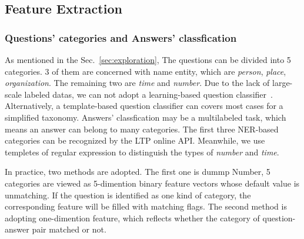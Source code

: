 \documentclass{llncs}
\begin{document}
\subsection{Feature Extraction}
\label{sec:feature}

\subsubsection{Questions' categories and Answers’ classfication}

As mentioned in the Sec.~\ref{sec:exploration}, 
The questions can be divided into 5 categories. 3 of them are concerned with name entity, which are \emph{person}, \emph{place}, \emph{organization}. The  remaining two are \emph{time} and \emph{number}. Due to the lack of large-scale labeled datas, we can not adopt a learning-based question classifier~\cite{Li2003Learning}. Alternatively, a template-based question classifier can covers most cases for a simplified taxonomy. 
Answers' classfication may be a multilabeled task, which means an answer can belong to many categories. The first three NER-based categories can be recognized by the LTP online API. Meanwhile, we use templetes  of regular expression to distinguish the types of \emph{number} and \emph{time}. 

In practice, two methods are adopted. The first one is dummp Number, 5 categories are viewed as 5-dimention binary feature vectors {\color{red}whose} default value is unmatching. If the question is identified as one kind of category, the corresponding feature will be filled with matching {\color{red}flags}. 
The second {\color{red}method} is adopting one-dimention feature, which {\color{red}reflects whether} the category of question-answer pair matched or not.
\end{document}
